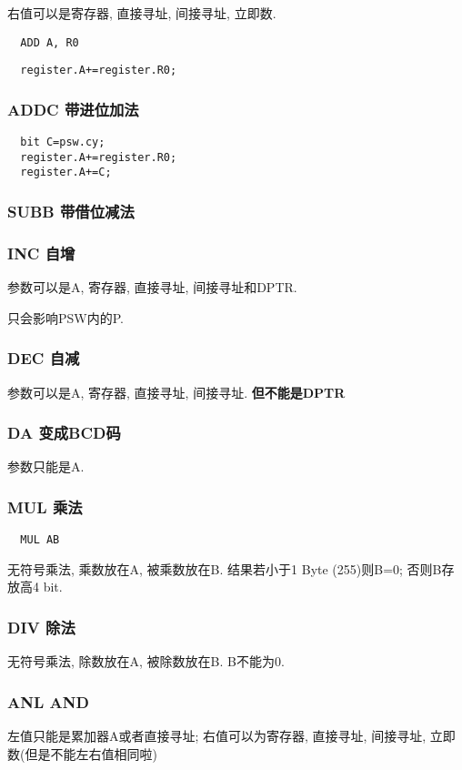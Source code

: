 \documentclass[a4paper]{report}
\begin{document}
右值可以是寄存器, 直接寻址, 间接寻址, 立即数. 
\begin{verbatim}
  ADD A, R0
\end{verbatim}
\begin{verbatim}
  register.A+=register.R0;
\end{verbatim}
\subsubsection{ADDC 带进位加法}
\begin{verbatim}
  bit C=psw.cy;
  register.A+=register.R0;
  register.A+=C;
\end{verbatim}
\subsubsection{SUBB 带借位减法}
\subsubsection{INC 自增}
参数可以是A, 寄存器, 直接寻址, 间接寻址和DPTR. 

只会影响PSW内的P. 
\subsubsection{DEC 自减}
参数可以是A, 寄存器, 直接寻址, 间接寻址. \textbf{但不能是DPTR}
\subsubsection{DA 变成BCD码}
参数只能是A. 
\subsubsection{MUL 乘法}
\begin{verbatim}
  MUL AB
\end{verbatim}
无符号乘法, 乘数放在A, 被乘数放在B. 结果若小于1 Byte (255)则B=0; 否则B存放高4 bit. 

\subsubsection{DIV 除法}
无符号乘法, 除数放在A, 被除数放在B. B不能为0. 
\subsubsection{ANL AND}
左值只能是累加器A或者直接寻址; 右值可以为寄存器, 直接寻址, 间接寻址, 立即数(但是不能左右值相同啦)
\end{document}
